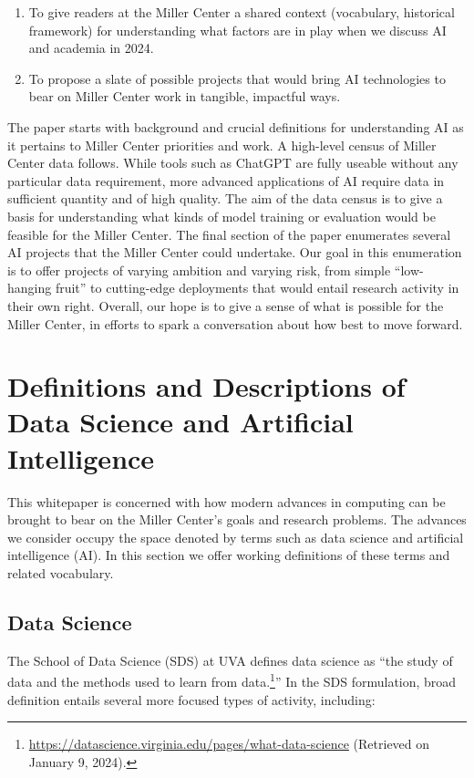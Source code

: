 \documentclass[11pt, oneside]{article}   	%
\begin{document}
\begin{enumerate}
\item To give readers at the Miller Center a shared context (vocabulary, historical framework) for understanding what factors are in play when we discuss AI and academia in 2024.
\item To propose a slate of possible projects that would bring AI technologies to bear on Miller Center work in tangible, impactful ways.
\end{enumerate}


The paper starts with background and crucial definitions for understanding AI as it pertains to Miller Center priorities and work.  A high-level census of Miller Center data follows.  While tools such as ChatGPT are fully useable without any particular data requirement, more advanced applications of AI require data in sufficient quantity and of high quality.  The aim of the data census is to give a basis for understanding what kinds of model training or evaluation would be feasible for the Miller Center.  The final section of the paper enumerates several AI projects that the Miller Center could undertake.  Our goal in this enumeration is to offer projects of varying ambition and varying risk, from simple “low-hanging fruit” to cutting-edge deployments that would entail research activity in their own right.  Overall, our hope is to give a sense of what is possible for the Miller Center, in efforts to spark a conversation about how best to move forward.


\section{Definitions and Descriptions of Data Science and Artificial Intelligence}\label{section.definitions}
This whitepaper is concerned with how modern advances in computing can be brought to bear on the Miller Center’s goals and research problems.  The advances we consider occupy the space denoted by terms such as data science and artificial intelligence (AI).  In this section we offer working definitions of these terms and related vocabulary.

\subsection{Data Science}\label{section.definitions.data-science}
The School of Data Science (SDS) at UVA defines data science as “the study of data and the methods used to learn from data.\footnote{\url{https://datascience.virginia.edu/pages/what-data-science} (Retrieved on January 9, 2024).}”  In the SDS formulation, broad definition entails several more focused types of activity, including:
\end{document}
